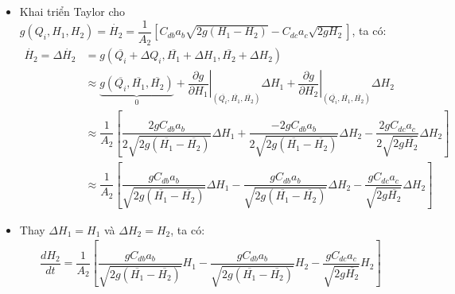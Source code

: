\begin{enumerate}[\it a.]
\begin{itemize}
\begin{itemize}
                        \item Khai triển Taylor cho $g\left({Q_i, H_1, H_2}\right) = \dot{H_2} = \dfrac{1}{A_2} \left[{C_{db}a_b\sqrt{2g(H_1 - H_2)} - C_{dc}a_c\sqrt{2gH_2}}\right]$, ta có:
                            \begin{align}
                                \dot{H_2} = \Delta \dot{H_2} & = g\left({\overline{Q_i} + \Delta Q_i, \overline{H_1} + \Delta H_1, \overline{H_2} + \Delta H_2}\right) \\
                                & \approx \underbrace{g\left({\overline{Q_i}, \overline{H_1}, \overline{H_2}}\right)}_{0} + \left.\dfrac{\partial g}{\partial H_1}\right|_{\left({\overline{Q_i}, \overline{H_1}, \overline{H_2}}\right)} \Delta H_1 + \left.\dfrac{\partial g}{\partial H_2}\right|_{\left({\overline{Q_i}, \overline{H_1}, \overline{H_2}}\right)} \Delta H_2\\
                                & \approx \dfrac{1}{A_2} \left[{\dfrac{2g C_{db}a_b}{2 \sqrt{2g(\overline{H_1} - \overline{H_2})}} \Delta H_1 + \dfrac{-2g C_{db}a_b}{2 \sqrt{2g(\overline{H_1} - \overline{H_2})}} \Delta H_2 - \dfrac{2g C_{dc}a_c}{2 \sqrt{2g\overline{H_2}}} \Delta H_2}\right]\\
                                & \approx \dfrac{1}{A_2} \left[{\dfrac{g C_{db}a_b}{\sqrt{2g(\overline{H_1} - \overline{H_2})}} \Delta H_1 - \dfrac{g C_{db}a_b}{\sqrt{2g(\overline{H_1} - \overline{H_2})}} \Delta H_2 - \dfrac{g C_{dc}a_c}{\sqrt{2g\overline{H_2}}} \Delta H_2}\right]
                            \end{align}

                        \item Thay $\Delta H_1= H_1$ và $\Delta H_2 = H_2$, ta có:
                            \begin{align}
                                \dfrac{dH_2}{dt} = \dfrac{1}{A_2} \left[{\dfrac{g C_{db}a_b}{\sqrt{2g(\overline{H_1} - \overline{H_2})}} H_1 - \dfrac{g C_{db}a_b}{\sqrt{2g(\overline{H_1} - \overline{H_2})}} H_2 - \dfrac{g C_{dc}a_c}{\sqrt{2g\overline{H_2}}} H_2}\right]
                            \end{align}
                    \end{itemize}


\end{itemize}
\end{enumerate}
